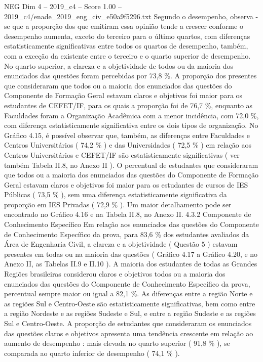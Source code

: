 \begin{textsample}{NEG Dim 4 – 2019\_c4 – Score 1.00 – 2019\_c4/enade\_2019\_eng\_civ\_e50a9f5296.txt}
Segundo o desempenho, observa -se que a proporção dos que emitiram essa opinião tende a crescer conforme o desempenho aumenta, exceto do terceiro para o último quartos, com diferenças estatisticamente significativas entre todos os quartos de desempenho, também, com a exceção da existente entre o terceiro e o quarto superior de desempenho.
No quarto superior, a clareza e a objetividade de todos ou da maioria dos enunciados das questões foram percebidas por 73,8 \%.
A proporção dos presentes que consideraram que todos ou a maioria dos enunciados das questões do Componente de Formação Geral estavam claros e objetivos foi maior para os estudantes de CEFET/IF, para os quais a proporção foi de 76,7 \%, enquanto as Faculdades foram a Organização Acadêmica com a menor incidência, com 72,0 \%, com diferença estatisticamente significativa entre os dois tipos de organização.
No Gráfico 4.15, é possível observar que, também, as diferenças entre Faculdades e Centros Universitários ( 74,2 \% ) e das Universidades ( 72,5 \% ) em relação aos Centros Universitários e CEFET/IF são estatisticamente significativas ( ver também Tabela II.8, no Anexo II ).
O percentual de estudantes que consideraram que todos ou a maioria dos enunciados das questões do Componente de Formação Geral estavam claros e objetivos foi maior para os estudantes de cursos de IES Públicas ( 73,5 \% ), sem uma diferença estatisticamente significativa da proporção em IES Privadas ( 72,9 \% ).
Um maior detalhamento pode ser encontrado no Gráfico 4.16 e na Tabela II.8, no Anexo II. 4.3.2 Componente de Conhecimento Específico Em relação aos enunciados das questões do Componente de Conhecimento Específico da prova, para 83,6 \% dos estudantes avaliados da Área de Engenharia Civil, a clareza e a objetividade ( Questão 5 ) estavam presentes em todas ou na maioria das questões ( Gráfico 4.17 a Gráfico 4.20, e no Anexo II, as Tabelas II.9 e II.10 ).
A maioria dos estudantes de todas as Grandes Regiões brasileiras considerou claros e objetivos todos ou a maioria dos enunciados das questões do Componente de Conhecimento Específico da prova, percentual sempre maior ou igual a 82,1 \%.
As diferenças entre a região Norte e as regiões Sul e Centro-Oeste são estatisticamente significativas, bem como entre a região Nordeste e as regiões Sudeste e Sul, e entre a região Sudeste e as regiões Sul e Centro-Oeste.
A proporção de estudantes que consideraram os enunciados das questões claros e objetivos apresenta uma tendência crescente em relação ao aumento de desempenho : mais elevada no quarto superior ( 91,8 \% ), se comparada ao quarto inferior de desempenho ( 74,1 \% ).

\end{textsample}

